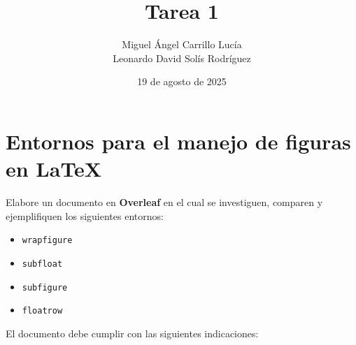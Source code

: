 \documentclass{article}
\title{Tarea 1}
\author{Miguel Ángel Carrillo Lucía \\ Leonardo David Solís Rodríguez}
\date{19 de agosto de 2025}
\begin{document}
\maketitle
\vspace{-10mm}

\section*{Entornos para el manejo de figuras en \LaTeX}

Elabore un documento en \textbf{Overleaf} en el cual se investiguen, comparen y ejemplifiquen los siguientes entornos:

\begin{itemize}
    \item \texttt{wrapfigure}
    \item \texttt{subfloat}
    \item \texttt{subfigure}
    \item \texttt{floatrow}
\end{itemize}

El documento debe cumplir con las siguientes indicaciones:
\end{document}
